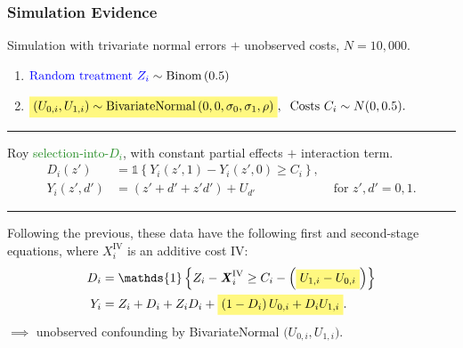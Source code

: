 \documentclass[dvipsnames]{beamer} %
\renewcommand{\vec}[1]{\boldsymbol{\mathit{#1}}}                           %
\newcommand{\indicator}[1]{\mathds{1}\left\{ #1 \right\}}                  %
\newcommand{\eqhighlight}[2]{\colorbox{#1!50}{$\displaystyle#2$}}
\begin{document}
\begin{frame}
    \frametitle{Simulation Evidence}
    Simulation with trivariate normal errors $+$ unobserved costs,
    $N = 10,000$.
    \vskip0cm
    \begin{enumerate}
        \item $\text{\textcolor{blue}{Random treatment $Z_i$}}
            \sim \text{Binom}\left(0.5 \right) $
        \item $ \eqhighlight{yellow}{
            \left( U_{0,i}, U_{1,i} \right) \sim
        \text{BivariateNormal}\left( 0, 0, \sigma_0, \sigma_1, \rho \right)},
            \;\; \text{Costs }C_i \sim N(0, 0.5). $
    \end{enumerate}
    \par\noindent\rule{\textwidth}{0.4pt}
    \pause
    Roy \textcolor{ForestGreen}{selection-into-$D_i$}, with constant partial effects $+$ interaction term.
    \begin{align*}
        D_i(z')    &= \indicator{Y_i(z', 1) - Y_i(z', 0) \geq C_i},&  \\
        Y_i(z',d') &= \left( z' + d' + z' d' \right) + U_{d'}
        & \text{ for } z',d' = 0,1.
    \end{align*}
    \par\noindent\rule{\textwidth}{0.4pt}
    \pause
    Following the previous, these data have the following first and second-stage equations, where $\vec X_i^\text{IV}$ is an additive cost IV:
    \begin{align*}
        D_i &= \indicator{Z_i - \vec X_i^{\text{IV}}
            \geq C_i - \Big(\eqhighlight{yellow}{U_{1,i} - U_{0,i}} \Big) } \\
        Y_i &= Z_i + D_i + Z_i D_i
            + \eqhighlight{yellow}{
                \left( 1 - D_i \right) U_{0,i} + D_i U_{1,i}}.
    \end{align*}
    $\implies$ unobserved confounding by BivariateNormal $\Big(U_{0,i}, U_{1,i}\Big)$.
\end{frame}
\end{document}
